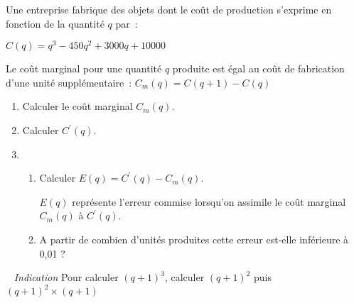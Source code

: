 
%
Une entreprise fabrique des objets dont le coût de production s'exprime en fonction de la quantité $q$ par~:
\par
$C\left(q\right)=q^{3}-450q^{2}+3000q+10000$
\par
Le coût marginal pour une quantité $q$ produite est égal au coût de fabrication d'une unité supplémentaire~: $C_{m}\left(q\right)=C\left(q+1\right)-C\left(q\right)$
\begin{enumerate}
     \item
     Calculer le coût marginal $C_{m}\left(q\right)$.
     \item
     Calculer $C^{\prime}\left(q\right)$.
     \item
     \begin{enumerate}[label=\alph*.]
          \item
          Calculer $E\left(q\right)=C^{\prime}\left(q\right)-C_{m}\left(q\right)$.
          \par
          $E\left(q\right)$ représente l'erreur commise lorsqu'on assimile le coût marginal $C_{m}\left(q\right)$ à $C^{\prime}\left(q\right)$.
          \item
          A partir de combien d'unités produites cette erreur est-elle inférieure à 0,01 ?
     \end{enumerate}
\end{enumerate}
~
\textit{Indication}
Pour calculer $\left(q+1\right)^{3}$, calculer $\left(q+1\right)^{2}$ puis $\left(q+1\right)^{2}\times \left(q+1\right)$
\begin{corrige}
     \par
{}%

\end{corrige}
